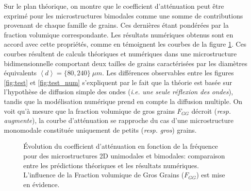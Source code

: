 Sur le plan théorique, on montre que le coefficient d'atténuation peut être exprimé pour les microstructures bimodales comme une somme de contributions provenant de chaque famille de grains.
Ces dernières étant pondérées par la fraction volumique correspondante.
Les résultats numériques obtenus sont en accord avec cette propriétés, comme en témoignent les courbes de la figure \ref{fig:attenuation}.
Ces courbes résultent de calculs théoriques et numériques dans une microstructure bidimensionnelle comportant deux tailles de grains caractérisées par les diamètres équivalents $\left\langle d \right\rangle =\{80,240\} \: \mu m$.
Les différences observables entre les figures \ref{fig:test} et \ref{fig:test_num} s'expliquent par le fait que la théorie est basée sur l'hypothèse de diffusion simple des ondes (\textit{i.e. une seule réflexion des ondes}), tandis que la modélisation numérique prend en compte la diffusion multiple. 
On voit qu'à mesure que la fraction volumique de gros grains $F_{GG}$ décroit (\textit{resp. augmente}), la courbe d'atténuation se rapproche du cas d'une microstructure monomodale constituée uniquement de petits (\textit{resp. gros}) grains.
\begin{figure}[h!]
  \centering
  {}
  {}
  
  \caption{{\'E}volution du coefficient d'atténuation en fonction de la fréquence pour des microstructures 2D unimodales et bimodales: comparaison entre les prédictions théoriques et les résultats numériques. L'influence de la Fraction volumique de Gros Grains ($F_{GG}$) est mise en évidence.}
  \label{fig:attenuation}
\end{figure}


